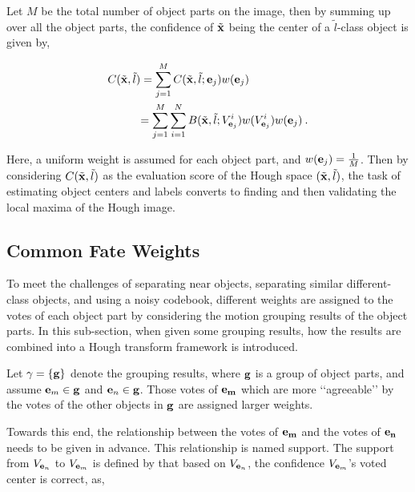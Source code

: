 Let $M$ be the total number of object parts on the image, then by summing up over all the object parts, the confidence of $\tilde{\bf{x}}$ being the center of a $\tilde{l}$-class object is given by,

\begin{equation}
\begin{aligned}
C({\tilde{\bf{x}}},\tilde{l}) &=\sum\limits^M_{j=1} C({\tilde{\bf{x}}},\tilde{l};{\bf{e}}_j)w({\bf{e}}_j) \\
&{
\begin{aligned}
=\sum\limits^M_{j=1} \sum\limits^N_{i=1} {B({\tilde{\bf{x}}},{\tilde{l}};{V_{{\bf{e}}_j}^i}) w({V_{{\bf{e}}_j}^i})w({\bf{e}}_j)} \:.
\end{aligned}
}
\end{aligned}
\label{eq3}
\end{equation}

Here, a uniform weight is assumed for each object part, and $w({\bf{e}}_j)=\frac 1 M$. Then by considering $C({\tilde{\bf{x}}},\tilde{l})$ as the evaluation score of the Hough space $({\tilde{\bf{x}}},\tilde{l})$, the task of estimating object centers and labels converts to finding and then validating the local maxima of the Hough image.

\subsection{Common Fate Weights}

To meet the challenges of separating near objects, separating similar different-class objects, and using a noisy codebook,  different weights are assigned to the votes of each object part by considering the motion grouping results of the object parts. In this sub-section, when given some grouping results, how the results are combined into a Hough transform framework is introduced.

Let $\gamma=\{\bf{g}\}$ denote the grouping results, where $\bf{g}$ is a group of object parts, and assume ${{\bf{e}}_m}\in \bf{g}$ and ${{\bf{e}}_n}\in \bf{g}$. Those votes of ${\bf{e}_m}$ which are more {\lq\lq}agreeable{\rq\rq} by the votes of the other objects in $\bf{g}$ are assigned larger weights.

Towards this end, the relationship between the votes of $\bf{e}_m$ and the votes of $\bf{e}_n$ needs to be given in advance. This relationship is named support. The support from ${V_{{{\bf{e}}_n}}}$ to ${V_{{{\bf{e}}_m}}}$ is defined by that based on ${V_{{{\bf{e}}_n}}}$, the confidence ${V_{{{\bf{e}}_m}}}$'s voted center is correct, as,


